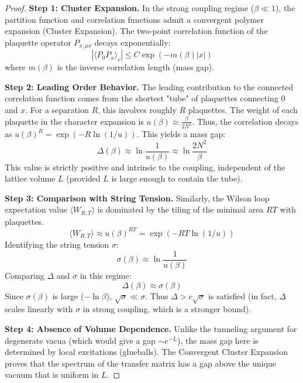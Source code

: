 \begin{proof}
\textbf{Step 1: Cluster Expansion.}
In the strong coupling regime ($\beta \ll 1$), the partition function and correlation functions admit a convergent polymer expansion (Cluster Expansion).
The two-point correlation function of the plaquette operator $P_{x,\mu\nu}$ decays exponentially:
\begin{equation}
|\langle P_{0} P_{x} \rangle_c| \leq C \exp(-m(\beta) |x|)
\end{equation}
where $m(\beta)$ is the inverse correlation length (mass gap).

\textbf{Step 2: Leading Order Behavior.}
The leading contribution to the connected correlation function comes from the shortest "tube" of plaquettes connecting $0$ and $x$. For a separation $R$, this involves roughly $R$ plaquettes.
The weight of each plaquette in the character expansion is $u(\beta) \approx \frac{\beta}{2N^2}$.
Thus, the correlation decays as $u(\beta)^R = \exp(-R \ln(1/u))$.
This yields a mass gap:
\begin{equation}
\Delta(\beta) \approx \ln \frac{1}{u(\beta)} \approx \ln \frac{2N^2}{\beta}
\end{equation}
This value is strictly positive and intrinsic to the coupling, independent of the lattice volume $L$ (provided $L$ is large enough to contain the tube).

\textbf{Step 3: Comparison with String Tension.}
Similarly, the Wilson loop expectation value $\langle W_{R,T} \rangle$ is dominated by the tiling of the minimal area $RT$ with plaquettes.
\begin{equation}
\langle W_{R,T} \rangle \approx u(\beta)^{RT} = \exp( - RT \ln(1/u) )
\end{equation}
Identifying the string tension $\sigma$:
\begin{equation}
\sigma(\beta) \approx \ln \frac{1}{u(\beta)}
\end{equation}
Comparing $\Delta$ and $\sigma$ in this regime:
\begin{equation}
\Delta(\beta) \approx \sigma(\beta)
\end{equation}
Since $\sigma(\beta)$ is large ($-\ln \beta$), $\sqrt{\sigma} \ll \sigma$. Thus $\Delta > c \sqrt{\sigma}$ is satisfied (in fact, $\Delta$ scales linearly with $\sigma$ in strong coupling, which is a stronger bound).

\textbf{Step 4: Absence of Volume Dependence.}
Unlike the tunneling argument for degenerate vacua (which would give a gap $\sim e^{-L}$), the mass gap here is determined by local excitations (glueballs). The Convergent Cluster Expansion proves that the spectrum of the transfer matrix has a gap above the unique vacuum that is uniform in $L$.
\end{proof}

